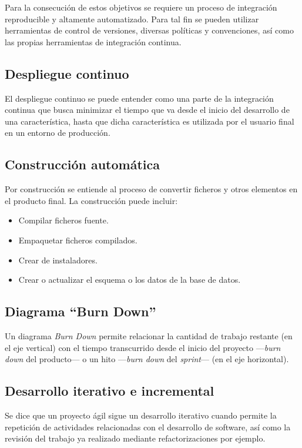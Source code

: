 Para la consecución de estos objetivos se requiere un proceso de integración reproducible y altamente automatizado. Para tal fin se pueden utilizar herramientas de control de versiones, diversas políticas y convenciones, así como las propias herramientas de integración continua.

\subsection{Despliegue continuo}

El despliegue continuo se puede entender como una parte de la integración continua que busca minimizar el tiempo que va desde el inicio del desarrollo de una característica, hasta que dicha característica es utilizada por el usuario final en un entorno de producción.

\subsection{Construcción automática}

Por construcción se entiende al proceso de convertir ficheros y otros elementos en el producto final. La construcción puede incluir:

\begin{itemize}
	\item Compilar ficheros fuente.
	\item Empaquetar ficheros compilados.
	\item Crear de instaladores.
	\item Crear o actualizar el esquema o los datos de la base de datos.
\end{itemize}

\subsection{Diagrama ``Burn Down''}

Un diagrama \textit{Burn Down} permite relacionar la cantidad de trabajo restante (en el eje vertical) con el tiempo transcurrido desde el inicio del proyecto —\textit{burn down} del producto— o un hito —\textit{burn down} del \textit{sprint}— (en el eje horizontal).

\subsection{Desarrollo iterativo e incremental}

Se dice que un proyecto ágil sigue un desarrollo iterativo cuando permite la repetición de actividades relacionadas con el desarrollo de software, así como la revisión del trabajo ya realizado mediante refactorizaciones por ejemplo.


